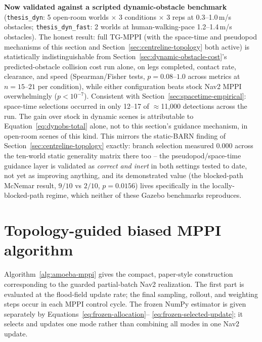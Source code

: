 \documentclass[11pt,a4paper]{article}
\begin{document}
\textbf{Now validated against a scripted dynamic-obstacle benchmark}
(\texttt{thesis\_dyn}: 5 open-room worlds $\times$ 3 conditions $\times$ 3
reps at 0.3--1.0\,m/s obstacles; \texttt{thesis\_dyn\_fast}: 2 worlds at
human-walking-pace 1.2--1.4\,m/s obstacles). The honest result: full TG-MPPI
(with the space-time and pseudopod mechanisms of this section and
Section~\ref{sec:centreline-topology} both active) is statistically
indistinguishable from Section~\ref{sec:dynamic-obstacle-cost}'s
predicted-obstacle collision cost run alone, on legs completed, contact
rate, clearance, and speed (Spearman/Fisher tests, $p=0.08$--$1.0$ across
metrics at $n=15$--$21$ per condition), while either configuration beats
stock Nav2 MPPI overwhelmingly ($p<10^{-7}$). Consistent with
Section~\ref{sec:spacetime-empirical}: space-time selections occurred in
only 12--17 of $\approx$11{,}000 detections across the run. The gain over
stock in dynamic scenes is attributable to
Equation~\eqref{eq:dynobs-total} alone, not to this section's guidance
mechanism, in open-room scenes of this kind. This mirrors the static-BARN
finding of Section~\ref{sec:centreline-topology} exactly: branch selection
measured $0.000$ across the ten-world static generality matrix there too --
the pseudopod/space-time guidance layer is validated as \emph{correct and
inert} in both settings tested to date, not yet as improving anything, and
its demonstrated value (the blocked-path McNemar result, $9/10$ vs $2/10$,
$p=0.0156$) lives specifically in the locally-blocked-path regime, which
neither of these Gazebo benchmarks reproduces.

\section{Topology-guided biased MPPI algorithm}

Algorithm~\ref{alg:amoeba-mppi} gives the compact, paper-style construction
corresponding to the guarded partial-batch Nav2 realization. The first part is
evaluated at the flood-field update rate; the final sampling, rollout, and
weighting steps occur in each MPPI control cycle. The frozen NumPy estimator is
given separately by Equations~\eqref{eq:frozen-allocation}--
\eqref{eq:frozen-selected-update}; it selects and updates one mode rather than
combining all modes in one Nav2 update.
\end{document}
